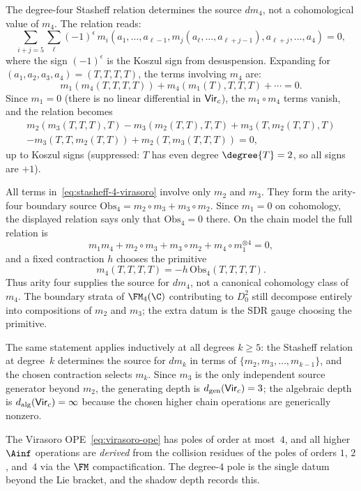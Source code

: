\begin{verification}
\label{ver:virasoro-m4}
The degree-four Stasheff relation determines the source \(d m_4\), not
a cohomological value of \(m_4\). The relation reads:
\begin{equation}\label{eq:stasheff-4}
 \sum_{i+j = 5} \sum_{\ell}
 (-1)^{\epsilon}\, m_i(a_1, \ldots, a_{\ell-1},
 m_j(a_\ell, \ldots, a_{\ell+j-1}),
 a_{\ell+j}, \ldots, a_4) = 0,
\end{equation}
where the sign $(-1)^{\epsilon}$ is the Koszul sign from
desuspension. Expanding for $(a_1, a_2, a_3, a_4) =
(T, T, T, T)$, the terms involving $m_4$ are:
\[
 m_1(m_4(T,T,T,T))
 + m_4(m_1(T), T, T, T) + \cdots = 0.
\]
Since $m_1 = 0$ (there is no linear differential in
$\mathsf{Vir}_c$), the $m_1 \circ m_4$ terms vanish, and the
relation becomes
\begin{multline}\label{eq:stasheff-4-virasoro}
 m_2(m_3(T,T,T), T) - m_3(m_2(T,T), T, T)
 + m_3(T, m_2(T,T), T) \\
 - m_3(T, T, m_2(T,T))
 + m_2(T, m_3(T,T,T)) = 0,
\end{multline}
up to Koszul signs (suppressed: $T$ has even degree
$\degree{T} = 2$, so all signs are $+1$).

All terms in~\eqref{eq:stasheff-4-virasoro} involve only
$m_2$ and $m_3$. They form the arity-four boundary source
\(\mathrm{Obs}_4=m_2\circ m_3+m_3\circ m_2\). Since \(m_1=0\)
on cohomology, the displayed relation says only that
\(\mathrm{Obs}_4=0\) there. On the chain model the full relation is
\[
  m_1m_4 + m_2\circ m_3 + m_3\circ m_2
  + m_4\circ m_1^{\otimes 4}=0,
\]
and a fixed contraction \(h\) chooses the primitive
\[
  m_4(T,T,T,T)=-h\,\mathrm{Obs}_4(T,T,T,T).
\]
Thus arity four supplies the source for \(d m_4\), not a canonical
cohomology class of \(m_4\). The boundary strata of $\FM_4(\C)$
contributing to \(D_0^2\) still decompose entirely into compositions
of \(m_2\) and \(m_3\); the extra datum is the SDR gauge choosing
the primitive.

The same statement applies inductively at all degrees $k \ge 5$:
the Stasheff relation at degree~$k$ determines the source for
\(d m_k\) in terms of $\{m_2, m_3, \ldots, m_{k-1}\}$, and the
chosen contraction selects \(m_k\). Since \(m_3\) is the only
independent source generator beyond \(m_2\), the generating depth is
$d_{\mathrm{gen}}(\mathsf{Vir}_c) = 3$; the algebraic depth is
$d_{\mathrm{alg}}(\mathsf{Vir}_c) = \infty$ because the chosen higher chain
operations are generically nonzero.

The Virasoro OPE~\eqref{eq:virasoro-ope} has poles of order at
most~$4$, and all higher $\Ainf$ operations are
\emph{derived} from the collision residues of the poles
of orders $1$, $2$, and~$4$ via the $\FM$ compactification.
The degree-$4$ pole is the single datum beyond the Lie bracket,
and the shadow depth records this.
\end{verification}



